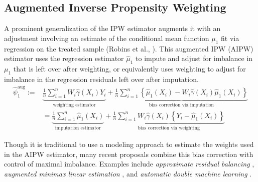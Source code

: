 \documentclass{article}
\theoremstyle{definition}
\newcommand{\<}{\langle}
\renewcommand{\>}{\rangle}
\begin{document}
\vspace{-.3cm}
\subsection{Augmented Inverse Propensity Weighting}
\label{sec:aipw}

A prominent generalization of the IPW estimator augments it with an adjustment involving an estimate of the conditional mean function $\mu_1$ fit via regression on the treated sample (Robins et al., \citeyear{robins1994estimation}). %
This augmented IPW (AIPW) estimator uses the regression estimator $\hat \mu_1$ to impute and adjust for imbalance in $\mu_1$ that is left over after weighting, or equivalently uses weighting to adjust for imbalance in the regression residuals left over after imputation.
\begin{align}
\hat{\psi}^{\text{aug}}_1
:=& \underbrace{\frac{1}{n}\sum_{i=1}^n W_i\hat{\gamma}(X_i) Y_i}_{\text{weighting estimator}} + \underbrace{\frac{1}{n}\sum_{i=1}^n \left\{\hat \mu_1(X_i) - W_i\hat{\gamma}(X_i)\hat \mu_1(X_i)\right\}}_{\text{bias correction via imputation}} \label{eq:aipw2} \\
&= \underbrace{\frac{1}{n}\sum_{i=1}^n \hat \mu_1(X_i)}_{\text{imputation estimator}} + \underbrace{\frac{1}{n}\sum_{i=1}^n W_i \hat \gamma(X_i) \left\{Y_i - \hat \mu_1(X_i)\right\}}_{\text{bias correction via weighting}} \label{eq:aipw2-imputation}
\end{align}

Though it is traditional to use a modeling approach to estimate the weights used in the AIPW estimator,
many recent proposals combine this bias correction with control of maximal imbalance. Examples include \emph{approximate residual balancing} \citep{athey2018approximate}, \emph{augmented minimax linear estimation} \citep{hirshberg2021augmented}, and \emph{automatic double machine learning} \citep*{chernozhukov2018automatic}.
\end{document}
